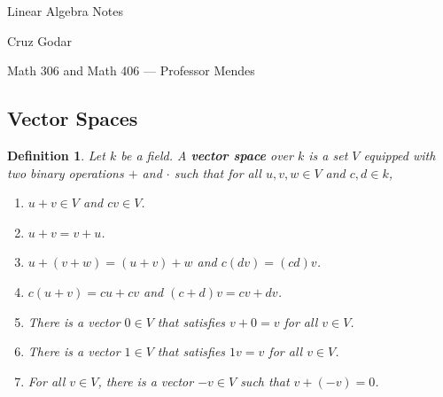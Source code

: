 \documentclass{article}
\theoremstyle{colontheorem}
\newtheorem{definition}[theorem]{Definition}
\newenvironment{Def}
{
	\begin{mdframed}[backgroundcolor=DefGreen!10]
	\begin{definition}
}
{
	\end{definition}
	\end{mdframed}
	
	\vspace{.15in}
}
\begin{document}
\vspace*{.5in}

\begin{center}
	\Huge Linear Algebra Notes\\
	
	\vspace{.25in}
	
	\Large Cruz Godar\\
	
	\vspace{.25in}
	
	\normalsize Math 306 and Math 406 --- Professor Mendes
\end{center}

\vspace{.5in}





\begin{center}
	\section{Vector Spaces}
	\vspace{.1in}
\end{center}



\begin{Def}
	
	Let $k$ be a field. A \textbf{vector space} over $k$ is a set $V$ equipped with two binary operations $+$ and $\cdot$ such that for all $u,v,w \in V$ and $c,d \in k$,
	
	\begin{enumerate}
		
		\item $u+v \in V$ and $cv \in V$.
		\item $u+v = v+u$.
		\item $u+(v+w) = (u+v)+w$ and $c(dv) = (cd)v$.
		\item $c(u+v) = cu+cv$ and $(c+d)v = cv+dv$.
		\item There is a vector $0 \in V$ that satisfies $v+0 = v$ for all $v \in V$.
		\item There is a vector $1 \in V$ that satisfies $1v = v$ for all $v \in V$.
		\item For all $v \in V$, there is a vector $-v \in V$ such that $v + (-v) = 0$.
		
	\end{enumerate}
	
\end{Def}
\end{document}
